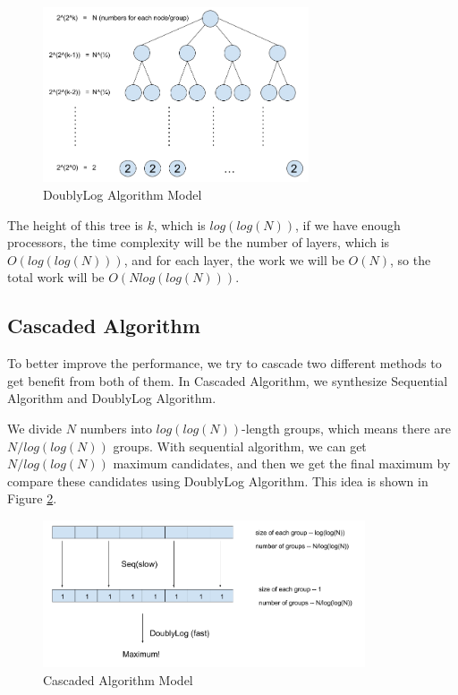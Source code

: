 \documentclass[twoside]{article}
\begin{document}
\begin{figure}[!ht]
  \centering
    \includegraphics[width=0.7\textwidth]{3.png}
  \caption{DoublyLog Algorithm Model}
    \label{doublylog}
\end{figure}

The height of this tree is $k$, which is $log(log(N))$, if we have enough processors, the time complexity will be the number of layers, which is $O(log(log(N)))$, and for each layer, the work we will be $O(N)$, so the total work will be $O(Nlog(log(N)))$.

\subsection{Cascaded Algorithm}

To better improve the performance, we try to cascade two different methods to get benefit from both of them. In Cascaded Algorithm, we synthesize Sequential Algorithm and DoublyLog Algorithm.

We divide $N$ numbers into $log(log(N))$-length groups, which means there are $N/log(log(N))$ groups. With sequential algorithm, we can get $N/log(log(N))$ maximum candidates, and then we get the final maximum by compare these candidates using DoublyLog Algorithm. This idea is shown in Figure \ref{cascaded}.

\begin{figure}[!ht]
  \centering
    \includegraphics[width=0.85\textwidth]{4.png}
  \caption{Cascaded Algorithm Model}
    \label{cascaded}
\end{figure}
\end{document}
